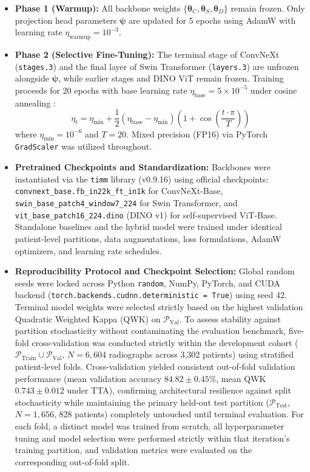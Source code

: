 \documentclass[10pt,journal]{IEEEtran}
\begin{document}
\begin{itemize}[leftmargin=*]
\item \textbf{Phase 1 (Warmup):} All backbone weights $\{\bm{\theta}_C, \bm{\theta}_S, \bm{\theta}_D\}$ remain frozen. Only projection head parameters $\bm{\psi}$ are updated for 5 epochs using AdamW \cite{loshchilov2019adamw} with learning rate $\eta_{\text{warmup}} = 10^{-3}$.
\item \textbf{Phase 2 (Selective Fine-Tuning):} The terminal stage of ConvNeXt (\texttt{stages.3}) and the final layer of Swin Transformer (\texttt{layers.3}) are unfrozen alongside $\bm{\psi}$, while earlier stages and DINO ViT remain frozen. Training proceeds for 20 epochs with base learning rate $\eta_{\text{base}} = 5 \times 10^{-5}$ under cosine annealing \cite{loshchilov2017sgdr}:
\begin{equation}
\eta_t = \eta_{\min} + \frac{1}{2}(\eta_{\text{base}} - \eta_{\min})\left(1 + \cos\left(\frac{t \cdot \pi}{T}\right)\right)
\label{eq:cosine}
\end{equation}
where $\eta_{\min} = 10^{-6}$ and $T = 20$. Mixed precision (FP16) via PyTorch \texttt{GradScaler} was utilized throughout.
\item \textbf{Pretrained Checkpoints and Standardization:} Backbones were instantiated via the \texttt{timm} library (v0.9.16) using official checkpoints: \texttt{convnext\_base.fb\_in22k\_ft\_in1k} for ConvNeXt-Base, \texttt{swin\_base\_patch4\_window7\_224} for Swin Transformer, and \texttt{vit\_base\_patch16\_224.dino} (DINO v1) for self-supervised ViT-Base. Standalone baselines and the hybrid model were trained under identical patient-level partitions, data augmentations, loss formulations, AdamW optimizers, and learning rate schedules.
\item \textbf{Reproducibility Protocol and Checkpoint Selection:} Global random seeds were locked across Python \texttt{random}, NumPy, PyTorch, and CUDA backend (\texttt{torch.backends.cudnn.deterministic = True}) using seed 42. Terminal model weights were selected strictly based on the highest validation Quadratic Weighted Kappa (QWK) on $\mathcal{P}_{\text{Val}}$. To assess stability against partition stochasticity without contaminating the evaluation benchmark, five-fold cross-validation was conducted strictly within the development cohort ($\mathcal{P}_{\text{Train}} \cup \mathcal{P}_{\text{Val}}$, $N = 6{,}604$ radiographs across 3,302 patients) using stratified patient-level folds. Cross-validation yielded consistent out-of-fold validation performance (mean validation accuracy $84.82 \pm 0.45\%$, mean QWK $0.743 \pm 0.012$ under TTA), confirming architectural resilience against split stochasticity while maintaining the primary held-out test partition ($\mathcal{P}_{\text{Test}}$, $N = 1{,}656$, 828 patients) completely untouched until terminal evaluation. For each fold, a distinct model was trained from scratch, all hyperparameter tuning and model selection were performed strictly within that iteration's training partition, and validation metrics were evaluated on the corresponding out-of-fold split.
\end{itemize}
\end{document}
